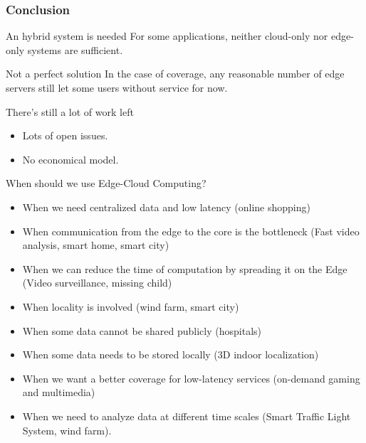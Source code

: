 \documentclass[utf8,xcolor=table, page number]{earlywinter}
\begin{document}
\begin{frame}
  \frametitle{Conclusion}

  \begin{block}{An hybrid system is needed}
    For some applications, neither cloud-only nor edge-only systems are sufficient.
  \end{block}
  \vfill
  \begin{alertblock}{Not a perfect solution}
    In the case of coverage, any reasonable number of edge servers still let some users without service for now.
  \end{alertblock}
  \vfill
  \begin{alertblock}{There's still a lot of work left}
    \begin{itemize}
      \item Lots of open issues.
      \item No economical model.
    \end{itemize}
  \end{alertblock}

  
\end{frame}


\begin{frame}{When should we use Edge-Cloud Computing?}
\begin{itemize}
\item When we need centralized data and low latency (online shopping)
\item When communication from the edge to the core is the bottleneck (Fast video analysis, smart home, smart city)
\item When we can reduce the time of computation by spreading it on the Edge (Video surveillance, missing child)
\item When locality is involved (wind farm, smart city)
\item When some data cannot be shared publicly (hospitals)
\item When some data needs to be stored locally (3D indoor localization)
\item When we want a better coverage for low-latency services (on-demand gaming and multimedia)
\item When we need to analyze data at different time scales (Smart Traffic Light System, wind farm). 
\end{itemize}
\end{frame}

          
\end{document}
